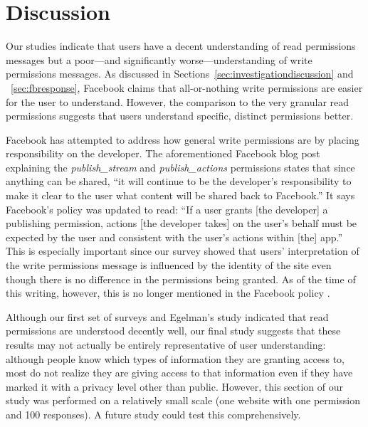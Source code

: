 \documentclass[10pt]{sig-alternate-10pt}
\begin{document}
\section{Discussion}


Our studies indicate that users have a decent understanding of read permissions messages but a poor---and significantly worse---understanding of write permissions messages. As discussed in Sections~\ref{sec:investigationdiscussion} and ~\ref{sec:fbresponse}, Facebook claims that all-or-nothing write permissions are easier for the user to understand. However, the comparison to the very granular read permissions suggests that users understand specific, distinct permissions better.

Facebook has attempted to address how general write permissions are by placing responsibility on the developer. The aforementioned Facebook blog post explaining the \emph{publish\_stream} and \emph{publish\_actions} permissions \cite{publishperms} states that since anything can be shared, ``it will continue to be the developer's responsibility to make it clear to the user what content will be shared back to Facebook.'' It says Facebook's policy was updated to read: ``If a user grants [the developer] a publishing permission, actions [the developer takes] on the user’s behalf must be expected by the user and consistent with the user’s actions within [the] app.'' This is especially important since our survey showed that users' interpretation of the write permissions message is influenced by the identity of the site even though there is no difference in the permissions being granted. As of the time of this writing, however, this is no longer mentioned in the Facebook policy \cite{fbpolicy}. 

Although our first set of surveys and Egelman's study \cite{egelman} indicated that read permissions are understood decently well, our final study suggests that these results may not actually be entirely representative of user understanding: although people know which types of information they are granting access to, most do not realize they are giving access to that information even if they have marked it with a privacy level other than public. However, this section of our study was performed on a relatively small scale (one website with one permission and 100 responses). A future study could test this comprehensively.
\end{document}
